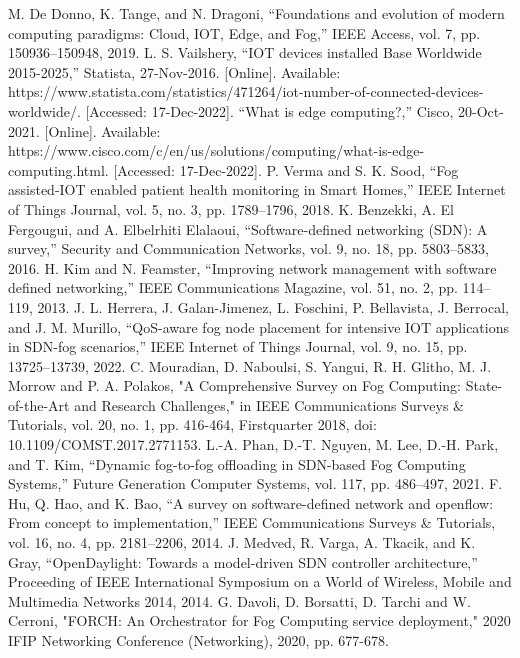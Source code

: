 \documentclass[conference]{IEEEtran}
\begin{document}
\begin{thebibliography}{00}

 M. De Donno, K. Tange, and N. Dragoni, “Foundations and evolution of modern computing paradigms: Cloud, IOT, Edge, and Fog,” IEEE Access, vol. 7, pp. 150936–150948, 2019. 
 L. S. Vailshery, “IOT devices installed Base Worldwide 2015-2025,” Statista, 27-Nov-2016. [Online]. Available: https://www.statista.com/statistics/471264/iot-number-of-connected-devices-worldwide/. [Accessed: 17-Dec-2022]. 
“What is edge computing?,” Cisco, 20-Oct-2021. [Online]. Available: https://www.cisco.com/c/en/us/solutions/computing/what-is-edge-computing.html. [Accessed: 17-Dec-2022].
P. Verma and S. K. Sood, “Fog assisted-IOT enabled patient health monitoring in Smart Homes,” IEEE Internet of Things Journal, vol. 5, no. 3, pp. 1789–1796, 2018. 
K. Benzekki, A. El Fergougui, and A. Elbelrhiti Elalaoui, “Software-defined networking (SDN): A survey,” Security and Communication Networks, vol. 9, no. 18, pp. 5803–5833, 2016. 
H. Kim and N. Feamster, “Improving network management with software defined networking,” IEEE Communications Magazine, vol. 51, no. 2, pp. 114–119, 2013. 
J. L. Herrera, J. Galan-Jimenez, L. Foschini, P. Bellavista, J. Berrocal, and J. M. Murillo, “QoS-aware fog node placement for intensive IOT applications in SDN-fog scenarios,” IEEE Internet of Things Journal, vol. 9, no. 15, pp. 13725–13739, 2022. 
C. Mouradian, D. Naboulsi, S. Yangui, R. H. Glitho, M. J. Morrow and P. A. Polakos, "A Comprehensive Survey on Fog Computing: State-of-the-Art and Research Challenges," in IEEE Communications Surveys \& Tutorials, vol. 20, no. 1, pp. 416-464, Firstquarter 2018, doi: 10.1109/COMST.2017.2771153.
L.-A. Phan, D.-T. Nguyen, M. Lee, D.-H. Park, and T. Kim, “Dynamic fog-to-fog offloading in SDN-based Fog Computing Systems,” Future Generation Computer Systems, vol. 117, pp. 486–497, 2021. 
F. Hu, Q. Hao, and K. Bao, “A survey on software-defined network and openflow: From concept to implementation,” IEEE Communications Surveys \& Tutorials, vol. 16, no. 4, pp. 2181–2206, 2014. 
J. Medved, R. Varga, A. Tkacik, and K. Gray, “OpenDaylight: Towards a model-driven SDN controller architecture,” Proceeding of IEEE International Symposium on a World of Wireless, Mobile and Multimedia Networks 2014, 2014. 
G. Davoli, D. Borsatti, D. Tarchi and W. Cerroni, "FORCH: An Orchestrator for Fog Computing service deployment," 2020 IFIP Networking Conference (Networking), 2020, pp. 677-678.

\end{thebibliography}
\end{document}
